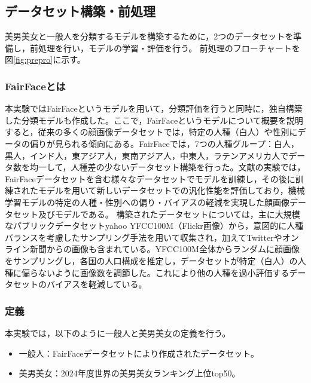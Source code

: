 \documentclass[a4paper,11pt,titlepage]{jsarticle}
\begin{document}
\subsection{データセット構築・前処理}
美男美女と一般人を分類するモデルを構築するために，2つのデータセットを準備し，前処理を行い，モデルの学習・評価を行う。
前処理のフローチャートを図\ref{fig:prepro}に示す。


\subsubsection{FairFaceとは}
本実験ではFairFaceというモデルを用いて，分類評価を行うと同時に，独自構築した分類モデルも作成した。ここで，FairFaceというモデルについて概要を説明すると，従来の多くの顔画像データセットでは，特定の人種（白人）や性別にデータの偏りが見られる傾向にある。FairFaceでは，7つの人種グループ：白人，黒人，インド人，東アジア人，東南アジア人，中東人，ラテンアメリカ人でデータ数を均一して，人種差の少ないデータセット構築を行った\cite{karkkainenFairFace}。文献\cite{karkkainenFairFace}の実験では，FairFaceデータセットを含む様々なデータセットでモデルを訓練し，その後に訓練されたモデルを用いて新しいデータセットでの汎化性能を評価しており，機械学習モデルの特定の人種・性別への偏り・バイアスの軽減を実現した顔画像データセット及びモデルである。
構築されたデータセットについては，主に大規模なパブリックデータセットyahoo YFCC100M（Flickr画像）から，意図的に人種バランスを考慮したサンプリング手法を用いて収集され，加えてTwitterやオンライン新聞からの画像も含まれている。YFCC100M全体からランダムに顔画像をサンプリングし，各国の人口構成を推定し，データセットが特定（白人）の人種に偏らないように画像数を調節した。これにより他の人種を過小評価するデータセットのバイアスを軽減している。




\subsubsection{定義}
本実験では，以下のように一般人と美男美女の定義を行う。
\begin{itemize}
    \item 一般人：FairFaceデータセットにより作成されたデータセット。
    \item 美男美女：2024年度世界の美男美女ランキング上位top50。
\end{itemize}
\end{document}
